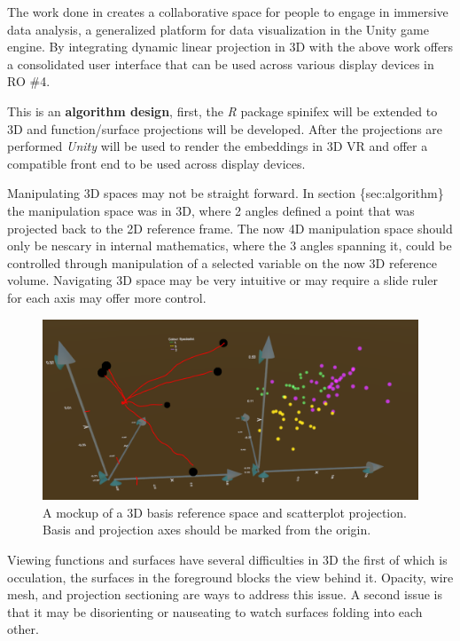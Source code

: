 \documentclass{monashthesis}
\begin{document}
The work done in \textcite{cordeil_imaxes:_2017} creates a collaborative
space for people to engage in immersive data analysis, a generalized
platform for data visualization in the Unity game engine. By integrating
dynamic linear projection in 3D with the above work offers a
consolidated user interface that can be used across various display
devices in RO \#4.

This is an \textbf{algorithm design}, first, the \emph{R} package
spinifex will be extended to 3D and function/surface projections will be
developed. After the projections are performed \emph{Unity} will be used
to render the embeddings in 3D VR and offer a compatible front end to be
used across display devices.

Manipulating 3D spaces may not be straight forward. In section
\{sec:algorithm\} the manipulation space was in 3D, where 2 angles
defined a point that was projected back to the 2D reference frame. The
now 4D manipulation space should only be nescary in internal
mathematics, where the 3 angles spanning it, could be controlled through
manipulation of a selected variable on the now 3D reference volume.
Navigating 3D space may be very intuitive or may require a slide ruler
for each axis may offer more control.





\begin{figure}

{\centering \includegraphics[width=0.7\linewidth]{./figures/RO3MockUp2} 

}

\caption{A mockup of a 3D basis reference space and
scatterplot projection. Basis and projection axes should be marked from
the origin.}\label{fig:RO3MockUp}
\end{figure}

Viewing functions and surfaces have several difficulties in 3D the first
of which is occulation, the surfaces in the foreground blocks the view
behind it. Opacity, wire mesh, and projection sectioning are ways to
address this issue. A second issue is that it may be disorienting or
nauseating to watch surfaces folding into each other.
\end{document}
